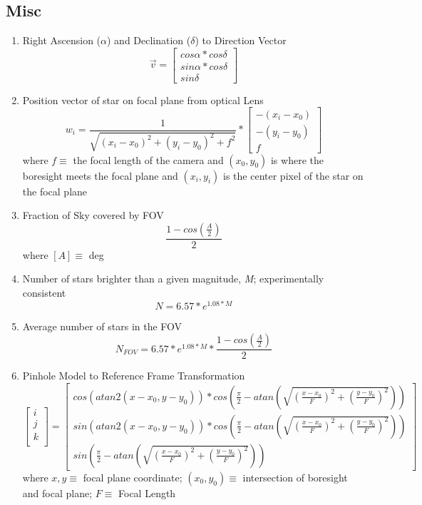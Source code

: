 \subsection{Misc}
\begin{enumerate}
    \item Right Ascension ($\alpha$) and Declination ($\delta$) to Direction Vector \cite{optical_system_error_analysis_and_calibration}
    \[ \overrightarrow{v} = \begin{bmatrix}
        cos\alpha*cos\delta \\
        sin\alpha*cos\delta \\
        sin\delta
    \end{bmatrix} \] 

    \item Position vector of star on focal plane from optical Lens \cite{optical_system_error_analysis_and_calibration}
    \[ w_i = \frac{1}{\sqrt{(x_i - x_0)^2 + (y_i - y_0)^2 + f^2}} * \begin{bmatrix}
        -(x_i - x_0)\\
        -(y_i - y_0) \\
        f
    \end{bmatrix} \]
    where $f \equiv$ the focal length of the camera and $(x_0, y_0)$ is where the boresight meets the focal plane and $(x_i, y_i)$ is the center pixel of the star on the focal plane

    \item Fraction of Sky covered by FOV\cite{accuracy_performance_of_star_trackers}
    \[ \frac{1-cos(\frac{A}{2})}{2} \]
    where $[A] \equiv$ deg   

    \item Number of stars brighter than a given magnitude, \emph{M}; experimentally consistent\cite{accuracy_performance_of_star_trackers}
    \[ N = 6.57 * e^{1.08*M} \]

    \item Average number of stars in the FOV\cite{accuracy_performance_of_star_trackers}
    \[ N_{FOV} = 6.57 * e^{1.08*M} * \frac{1-cos(\frac{A}{2})}{2} \]

    \item Pinhole Model to Reference Frame Transformation\cite{accuracy_performance_of_star_trackers}
    \[ \begin{bmatrix}
        i \\
        j \\
        k \\
    \end{bmatrix} = \begin{bmatrix}
        cos(atan2(x - x_0, y - y_0)) * cos(\frac{\pi}{2} - atan(\sqrt{(\frac{x - x_0}{F})^2 + (\frac{y - y_0}{F})^2})) \\
        sin(atan2(x - x_0, y - y_0)) * cos(\frac{\pi}{2} - atan(\sqrt{(\frac{x - x_0}{F})^2 + (\frac{y - y_0}{F})^2})) \\
        sin(\frac{\pi}{2} - atan(\sqrt{(\frac{x - x_0}{F})^2 + (\frac{y - y_0}{F})^2}))
    \end{bmatrix} \]
    where $x,y \equiv$ focal plane coordinate; $(x_0, y_0) \equiv$ intersection of boresight and focal plane; $F \equiv$ Focal Length


\end{enumerate}
